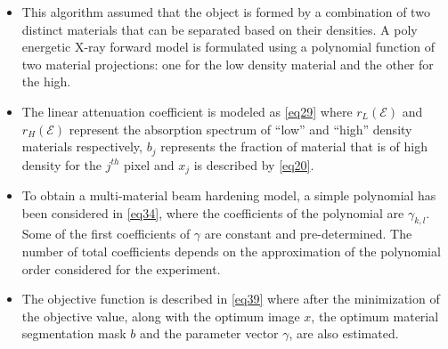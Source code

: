 \begin{itemize}

  \item This algorithm assumed that the object  is formed by a combination of two distinct materials that can be separated based on their densities. A poly energetic X-ray forward model is formulated using a polynomial function of two material projections: one for the low density material and the other for the high.
  
  \item The linear attenuation coefficient is modeled as \ref{eq29} where $r_L(\mathcal{E})$ and $r_H(\mathcal{E})$ represent  the absorption spectrum of ``low'' and ``high'' density materials respectively, $b_j$ represents the fraction of material that is of high density for the $j^{th}$ pixel and $x_j$ is described by \ref{eq20}.
  
  \item To obtain a multi-material beam hardening model, a simple polynomial has been considered in \ref{eq34}, where the coefficients of the polynomial are $\gamma_{k,l}$. Some of the first coefficients of $\gamma$ are constant and pre-determined. The number of total coefficients depends on the approximation of the polynomial order considered for the experiment.
  
  \item The objective function is described in \ref{eq39} where after the minimization of the objective value, along with the optimum image $x$, the optimum material segmentation mask $b$ and the parameter vector $\gamma$, are also estimated.
   
\end{itemize}